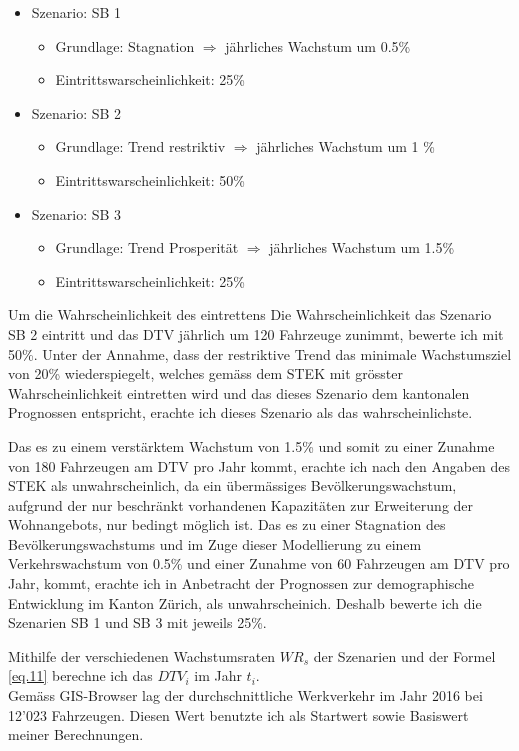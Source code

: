 \pagebreak

\begin{itemize}
\item Szenario: SB 1
	\begin{itemize}
	\item Grundlage: Stagnation $\Rightarrow$ jährliches Wachstum um 0.5\%
	\item Eintrittswarscheinlichkeit: 25\%
	\end{itemize}
\item Szenario: SB 2
	\begin{itemize}
	\item Grundlage: Trend restriktiv  $\Rightarrow$ jährliches Wachstum um 1 \%
	\item Eintrittswarscheinlichkeit: 50\%
	\end{itemize}
\item Szenario: SB 3
	\begin{itemize}
	\item Grundlage: Trend Prosperität  $\Rightarrow$ jährliches Wachstum um 1.5\%
	\item Eintrittswarscheinlichkeit: 25\%
	\end{itemize}
\end{itemize}

Um die Wahrscheinlichkeit des eintrettens 
Die Wahrscheinlichkeit das Szenario SB 2 eintritt und das DTV jährlich um 120 Fahrzeuge zunimmt, bewerte ich mit 50\%. Unter der Annahme, dass der restriktive Trend das minimale Wachstumsziel von 20\% wiederspiegelt, welches gemäss dem STEK mit grösster Wahrscheinlichkeit eintretten wird und das dieses Szenario dem kantonalen Prognossen entspricht, erachte ich dieses Szenario als das wahrscheinlichste.

Das es zu einem verstärktem Wachstum von 1.5\% und somit zu einer Zunahme von 180 Fahrzeugen am DTV pro Jahr kommt, erachte ich nach den Angaben des STEK als unwahrscheinlich, da ein übermässiges Bevölkerungswachstum, aufgrund der nur beschränkt vorhandenen Kapazitäten zur Erweiterung der Wohnangebots, nur bedingt möglich ist. Das es zu einer Stagnation des Bevölkerungswachstums und im Zuge dieser Modellierung zu einem Verkehrswachstum von 0.5\% und einer Zunahme von 60 Fahrzeugen am DTV pro Jahr, kommt, erachte ich in Anbetracht der Prognossen zur demographische Entwicklung im Kanton Zürich, als unwahrscheinich. Deshalb bewerte ich die Szenarien SB 1 und SB 3 mit jeweils 25\%.

Mithilfe der verschiedenen Wachstumsraten $WR_{s}$ der Szenarien und der Formel \ref{eq.11} berechne ich das $DTV_{i}$ im Jahr $t_{i}$. \\
Gemäss GIS-Browser lag der durchschnittliche Werkverkehr im Jahr 2016 bei 12'023 Fahrzeugen. Diesen Wert benutzte ich als Startwert sowie Basiswert meiner Berechnungen. 

